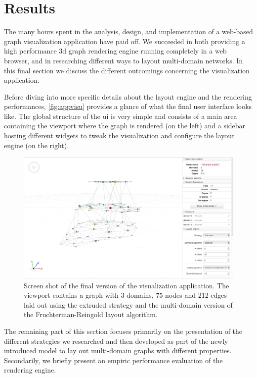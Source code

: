 \section{Results}
\label{sec:visu/results}

The many hours spent in the analysis, design, and implementation of a web-based graph visualization application have paid off. We succeeded in both providing a high performance \gls{3d} graph rendering engine running completely in a web browser, and in researching different ways to layout multi-domain networks. In this final section we discuss the different outcomings concerning the visualization application.

Before diving into more specific details about the layout engine and the rendering performances, \vref{fig:appvisu} provides a glance of what the final user interface looks like. The global structure of the \gls{ui} is very simple and consists of a main area containing the viewport where the graph is rendered (on the left) and a sidebar hosting different widgets to tweak the visualization and configure the layout engine (on the right).

\begin{figure}
  \centering
  \includegraphics[width=\linewidth]{images/visuapp}
  \caption[Screen shot of the visualization application.]{Screen shot of the final version of the visualization application. The viewport contains a graph with 3 domains, 75 nodes and 212 edges laid out using the extruded strategy and the multi-domain version of the Fruchterman-Reingold layout algorithm.}
  \label{fig:appvisu}
\end{figure}

The remaining part of this section focuses primarily on the presentation of the different strategies we researched and then developed as part of the newly introduced model to lay out multi-domain graphs with different properties. Secondarily, we briefly present an empiric performance evaluation of the rendering engine.

